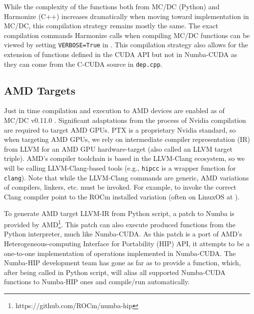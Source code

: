 While the complexity of the functions both from MC/DC (Python) and Harmonize (C++) increases dramatically when moving toward implementation in MC/DC, this compilation strategy remains mostly the same.
The exact compilation commands Harmonize calls when compiling MC/DC functions can be viewed by setting \texttt{VERBOSE=True} in .
This compilation strategy also allows for the extension of functions defined in the CUDA API but not in Numba-CUDA as they can come from the C-CUDA source in \texttt{dep.cpp}.

\subsection{AMD Targets}
Just in time compilation and execution to AMD devices are enabled as of MC/DC v0.11.0 \cite{transport_cement_mcdc_2024}.
Significant adaptations from the process of Nvidia compilation are required to target AMD GPUs.
PTX is a proprietary Nvidia standard, so when targeting AMD GPUs, we rely on intermediate compiler representation (IR) from LLVM for an AMD GPU hardware-target (also called an LLVM target triple).
AMD's compiler toolchain is based in the LLVM-Clang ecosystem, so we will be calling LLVM-Clang-based tools (e.g., \texttt{hipcc} is a wrapper function for \texttt{clang}).
Note that while the LLVM-Clang commands are generic, AMD variations of compilers, linkers, etc. must be invoked.
For example, to invoke the correct Clang compiler point to the ROCm installed variation (often on LinuxOS at ).

To generate AMD target LLVM-IR from Python script, a patch to Numba is provided by AMD\footnote{https://github.com/ROCm/numba-hip}.
This patch can also execute produced functions from the Python interpreter, much like Numba-CUDA.
As this patch is a port of AMD's Heterogeneous-computing Interface for Portability (HIP) API, it attempts to be a one-to-one implementation of operations implemented in Numba-CUDA.%
The Numba-HIP development team has gone as far as to provide a  function, which, after being called in Python script, will alias all supported Numba-CUDA functions to Numba-HIP ones and compile/run automatically.

